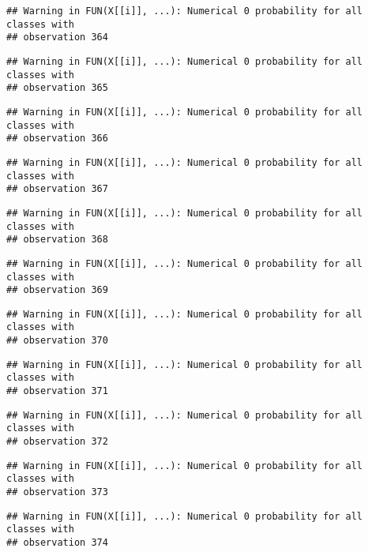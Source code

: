 \documentclass[
]{article}
\begin{document}
\begin{verbatim}
## Warning in FUN(X[[i]], ...): Numerical 0 probability for all classes with
## observation 364
\end{verbatim}

\begin{verbatim}
## Warning in FUN(X[[i]], ...): Numerical 0 probability for all classes with
## observation 365
\end{verbatim}

\begin{verbatim}
## Warning in FUN(X[[i]], ...): Numerical 0 probability for all classes with
## observation 366
\end{verbatim}

\begin{verbatim}
## Warning in FUN(X[[i]], ...): Numerical 0 probability for all classes with
## observation 367
\end{verbatim}

\begin{verbatim}
## Warning in FUN(X[[i]], ...): Numerical 0 probability for all classes with
## observation 368
\end{verbatim}

\begin{verbatim}
## Warning in FUN(X[[i]], ...): Numerical 0 probability for all classes with
## observation 369
\end{verbatim}

\begin{verbatim}
## Warning in FUN(X[[i]], ...): Numerical 0 probability for all classes with
## observation 370
\end{verbatim}

\begin{verbatim}
## Warning in FUN(X[[i]], ...): Numerical 0 probability for all classes with
## observation 371
\end{verbatim}

\begin{verbatim}
## Warning in FUN(X[[i]], ...): Numerical 0 probability for all classes with
## observation 372
\end{verbatim}

\begin{verbatim}
## Warning in FUN(X[[i]], ...): Numerical 0 probability for all classes with
## observation 373
\end{verbatim}

\begin{verbatim}
## Warning in FUN(X[[i]], ...): Numerical 0 probability for all classes with
## observation 374
\end{verbatim}
\end{document}
